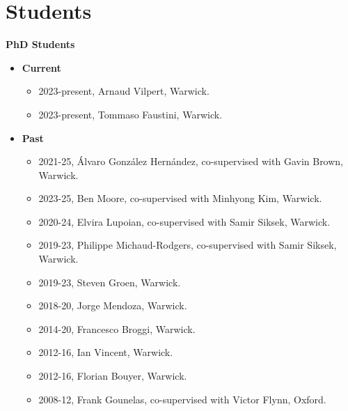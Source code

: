 \section{Students}

{\textbf{PhD Students}}

\begin{itemize}
\item
{\textbf{Current}}
\begin{itemize}
\vspace{-\smallskipamount}
\item
2023-present, Arnaud Vilpert, Warwick.
\vspace{-\smallskipamount}
\item
2023-present, Tommaso Faustini, Warwick.
\vspace{-\smallskipamount}
\end{itemize}
\item
{\textbf{Past}}
\begin{itemize}
\vspace{-\smallskipamount}
\item
2021-25, \'Alvaro Gonz\'alez Hern\'andez, co-supervised with Gavin Brown, Warwick.
\vspace{-\smallskipamount}
\item
2023-25, Ben Moore, co-supervised with Minhyong Kim, Warwick.
\vspace{-\smallskipamount}
\item
2020-24, Elvira Lupoian, co-supervised with Samir Siksek, Warwick.
\vspace{-\smallskipamount}
\item
2019-23, Philippe Michaud-Rodgers, co-supervised with Samir Siksek, Warwick.
\item
2019-23, Steven Groen, Warwick.
\vspace{-\smallskipamount}
\item
2018-20, Jorge Mendoza, Warwick.
\vspace{-\smallskipamount}
\item
2014-20, Francesco Broggi, Warwick.
\vspace{-\smallskipamount}
\item
2012-16, Ian Vincent, Warwick.
\vspace{-\smallskipamount}
\item
2012-16, Florian Bouyer, Warwick.
\vspace{-\smallskipamount}
\item
2008-12, Frank Gounelas, co-supervised with Victor Flynn, Oxford.
\end{itemize}
\end{itemize}

